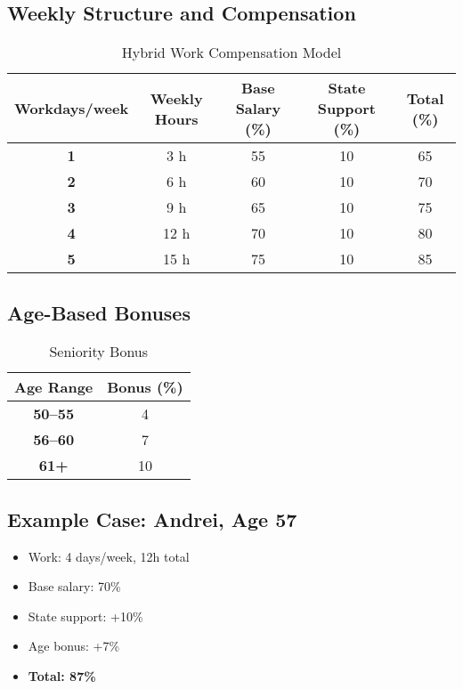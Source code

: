 \documentclass[12pt]{article}
\begin{document}
\subsection{Weekly Structure and Compensation}

\begin{table}[h!]
\centering
\begin{tabular}{>{\bfseries}c c c c c}
Workdays/week & Weekly Hours & Base Salary (\%) & State Support (\%) & Total (\%) \\
\midrule
1 & 3 h & 55 & 10 & 65 \\
2 & 6 h & 60 & 10 & 70 \\
3 & 9 h & 65 & 10 & 75 \\
4 & 12 h & 70 & 10 & 80 \\
5 & 15 h & 75 & 10 & 85 \\
\end{tabular}
\caption{Hybrid Work Compensation Model}
\end{table}

\subsection{Age-Based Bonuses}

\begin{table}[h!]
\centering
\begin{tabular}{>{\bfseries}c c}
Age Range & Bonus (\%) \\
\midrule
50--55 & 4 \\
56--60 & 7 \\
61+ & 10 \\
\end{tabular}
\caption{Seniority Bonus}
\end{table}

\subsection{Example Case: Andrei, Age 57}

\begin{itemize}
  \item Work: 4 days/week, 12h total
  \item Base salary: 70\%
  \item State support: +10\%
  \item Age bonus: +7\%
  \item \textbf{Total: 87\%}
\end{itemize}
\end{document}

